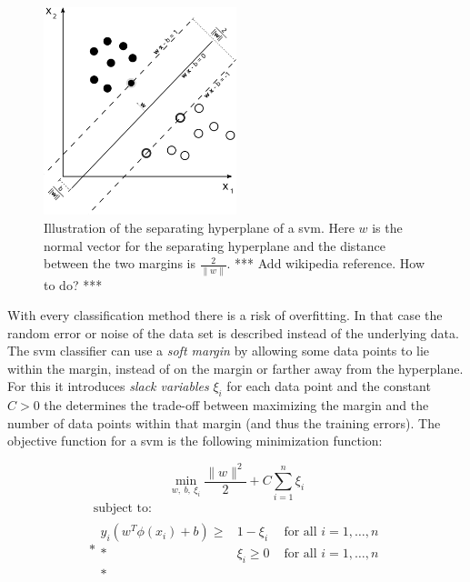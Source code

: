 \begin{figure}
\centering
  \includegraphics[width=0.5\textwidth]{./Figures/chapter3/svm_separating_plane_with_margin.png}
  \caption[\gls{svm} and the separating hyperplane]{Illustration of the separating hyperplane of a \gls{svm}. Here $w$ is the normal vector for the separating hyperplane and the distance between the two margins is $\frac{2}{\lVert{w}\rVert}$. *** Add wikipedia reference. How to do? ***}
  \label{fig:svm_hyperplane}
\end{figure}

With every classification method there is a risk of overfitting.
In that case the random error or noise of the data set is described instead of the underlying data.
The \gls{svm} classifier can use a \emph{soft margin} by allowing some data points to lie within the margin, instead of on the margin or farther away from the hyperplane.
For this it introduces \emph{slack variables} $\xi_i$ for each data point and the constant $C > 0$ the determines the trade-off between maximizing the margin and the number of data points within that margin (and thus the training errors).
The objective function for a \gls{svm} is the following minimization function:

\begin{equation}\label{eq:svm_objective}
  \operatorname*{min}_{w,\ b,\ \xi_i} \frac{ \lVert{w}\rVert^2 }{2} + C \sum_{i=1}^n \xi_i
\end{equation}
\begin{equation}
  \begin{multlined}
  \mbox{ subject to: } \\*
  \begin{aligned}
  y_i( w^T \phi(x_i) + b) \geq & 1 - \xi_i & \mbox{ for all } i = 1, \dots, n \\*
   & \xi_i \geq 0 & \mbox{ for all } i = 1, \dots, n\\*
  \end{aligned}
  \end{multlined}
\end{equation}

